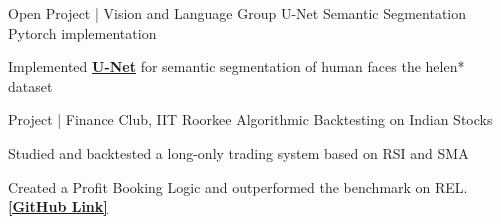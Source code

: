 \begin{cventries}
\cventry
{Open Project | Vision and Language Group} %
{U-Net Semantic Segmentation Pytorch implementation} %
{} %
{} %
{
	\begin{cvitems} %
		\item {Implemented \href{https://arxiv.org/pdf/1505.04597.pdf}{\bf U-Net} for semantic segmentation of human faces the helen* dataset}
	\end{cvitems}
}

\cventry
{Project | Finance Club, IIT Roorkee} %
{Algorithmic Backtesting on Indian Stocks} %
{} %
{} %
{
	\begin{cvitems} %
		\item {Studied and backtested a long-only trading system based on RSI and SMA}
		\item {Created a Profit Booking Logic and outperformed the benchmark on REL. {\href{https://github.com/ChanBong/finance_projects}{\bf [GitHub Link]}}}
	\end{cvitems}
}
    




\end{cventries}